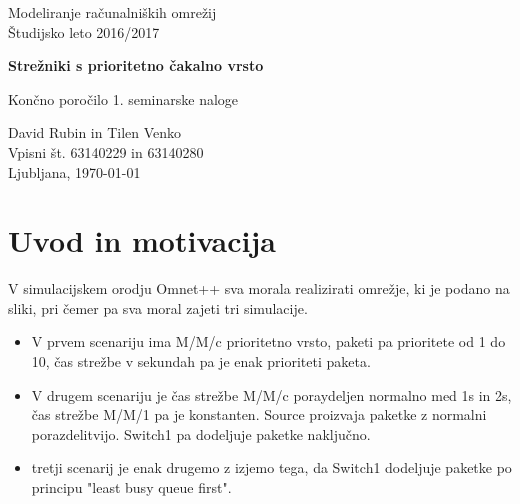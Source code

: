 \documentclass[a4paper,11pt]{article}
\begin{document}
\label{naslov}
\thispagestyle{empty}

\begin{center}
\begin{Large}
Modeliranje računalniških omrežij\\
Študijsko leto 2016/2017\\
\end{Large}

\vspace*{4cm}
\begin{LARGE}
\textbf{Strežniki s prioritetno čakalno vrsto\\}
\end{LARGE}
\vspace*{0.5cm}

\begin{Large}
Končno poročilo 1. seminarske naloge\\

\vspace*{4cm}

David Rubin in Tilen Venko\\
Vpisni št. 63140229 in 63140280\\

\vspace*{5cm}
Ljubljana, \today
\end{Large}
\end{center}

\pagebreak
\setcounter{page}{1}


\label{Kazalo}
\tableofcontents
\thispagestyle{empty}
\pagebreak

\section{Uvod in motivacija}

V simulacijskem orodju 	Omnet++ sva morala realizirati omrežje, ki je podano na sliki, pri čemer pa sva moral zajeti tri simulacije.
\begin{itemize}
  \item V prvem scenariju ima M/M/c prioritetno vrsto, paketi pa prioritete od 1 do 			10, čas strežbe v sekundah pa je enak prioriteti paketa. 
  \item V drugem scenariju je čas strežbe M/M/c poraydeljen normalno med 1s in 2s, 				čas strežbe M/M/1 pa je konstanten. Source proizvaja paketke z normalni 				porazdelitvijo. Switch1 pa dodeljuje paketke naključno.
  \item tretji scenarij je enak drugemo z izjemo tega, da Switch1 dodeljuje paketke 			po principu "least busy queue first".
\end{itemize}
\end{document}
